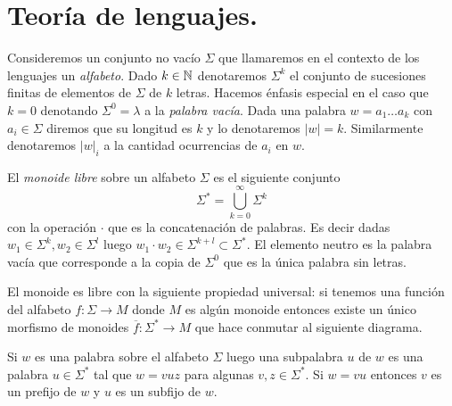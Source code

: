 \documentclass[tesis.tex]{subfiles}
\begin{document}
\section{Teoría de lenguajes.}	

Consideremos un conjunto no vacío $\Sigma$ que llamaremos en el contexto de los lenguajes un \emph{alfabeto}. 
Dado $k \in \mathbb{N}$ denotaremos $\Sigma^k$ el conjunto de sucesiones finitas de elementos de $\Sigma$ de $k$ letras.
Hacemos énfasis especial en el caso que $k=0$ denotando $\Sigma^0 = \lambda$ a la \emph{palabra vacía}.
Dada una palabra $w= a_1 \dots a_k$ con  $a_i \in \Sigma$ diremos que su longitud es $k$ y lo denotaremos $|w| = k$. 
Similarmente denotaremos $|w|_{i}$ a la cantidad ocurrencias de $a_{i}$ en $w$.



\begin{deff}
	El \emph{monoide libre} sobre un alfabeto $\Sigma$ es el siguiente conjunto
	\begin{equation*}
		\Sigma^{*} = \bigcup_{k=0}^{\infty} \Sigma^k
	\end{equation*}
	con la operación $\cdot$ que es la concatenación de palabras. 
	Es decir dadas $w_1 \in \Sigma^{k}, w_2 \in \Sigma^{l}$ luego $w_1 \cdot w_2 \in \Sigma^{k+l} \subset \Sigma^*$. El elemento neutro es la palabra vacía que corresponde a la copia de $\Sigma^0$ que es la única palabra sin letras. 
\end{deff}
\begin{obs}
	El monoide es libre con la siguiente propiedad universal: si tenemos una función del alfabeto $f: \Sigma \to M$ donde $M$ es algún monoide entonces existe un único morfismo de monoides $\overline f: \Sigma^{*} \to M$ que hace conmutar al siguiente diagrama.	
	
	\begin{center}
	\end{center}
	
\end{obs}

Si $w$ es una palabra sobre el alfabeto $\Sigma$ luego una subpalabra $u$ de $w$ es una palabra $u \in \Sigma^*$ tal que $w = vuz$ para algunas $v, z \in \Sigma^*$. Si $w = vu$ entonces $v$ es un prefijo de $w$ y $u$ es un subfijo de $w$.
\end{document}
